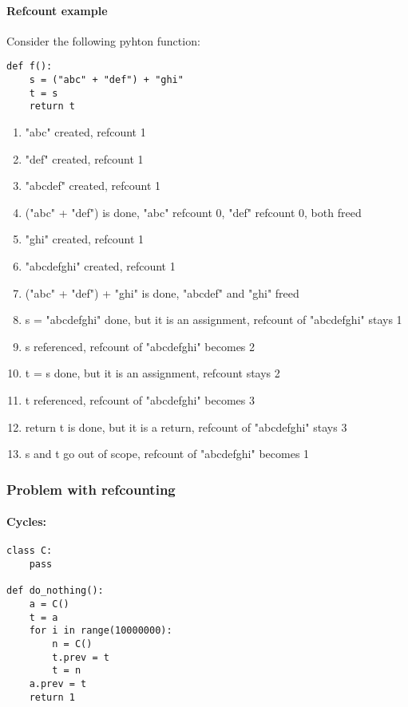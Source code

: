 \documentclass[12pt]{article}
\begin{document}
\paragraph{Refcount example} 
Consider the following pyhton function:
\begin{lstlisting}
def f():
    s = ("abc" + "def") + "ghi"
    t = s
    return t
\end{lstlisting}

\begin{enumerate}
  \item "abc" created, refcount 1
  \item "def" created, refcount 1
  \item "abcdef" created, refcount 1
  \item ("abc" + "def") is done, "abc" refcount 0, "def" refcount 0, both freed
  \item "ghi" created, refcount 1
  \item "abcdefghi" created, refcount 1
  \item ("abc" + "def") + "ghi" is done, "abcdef" and "ghi" freed
  \item s = "abcdefghi" done, but it is an assignment, refcount of "abcdefghi" stays 1
  \item s referenced, refcount of "abcdefghi" becomes 2
  \item t = s done, but it is an assignment, refcount stays 2
  \item t referenced, refcount of "abcdefghi" becomes 3
  \item return t is done, but it is a return, refcount of "abcdefghi" stays 3
  \item s and t go out of scope, refcount of "abcdefghi" becomes 1
\end{enumerate}

\subsubsection{Problem with refcounting}
\paragraph{Cycles:}

\begin{lstlisting}
class C:
    pass

def do_nothing():
    a = C()
    t = a
    for i in range(10000000):
        n = C()
        t.prev = t
        t = n
    a.prev = t
    return 1
\end{lstlisting}
\end{document}
